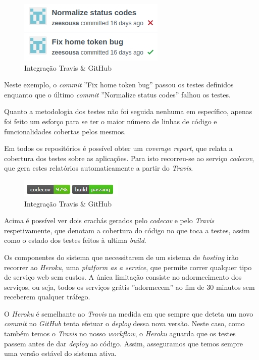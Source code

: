 \begin{figure}[H]
  \centering
        \includegraphics[scale=0.65]{img/github.jpg}
  \caption{Integração Travis \& GitHub}
\end{figure}

Neste exemplo, o \textit{commit} ''Fix home token bug'' passou os testes definidos enquanto que o último \textit{commit} ''Normalize status codes'' falhou os testes.

Quanto a metodologia dos testes não foi seguida nenhuma em específico, apenas foi feito um esforço para se ter o maior número de linhas de código e funcionalidades cobertas pelos mesmos.

Em todos os repositórios é possível obter um \textit{coverage report}, que relata a cobertura dos testes sobre as aplicações. Para isto recorreu-se ao serviço \textit{codecov}, que gera estes relatórios automaticamente a partir do \textit{Travis}.

\begin{figure}[H]
  \centering
        \includegraphics[scale=0.65]{img/github-badges.jpg}
  \caption{Integração Travis \& GitHub}
\end{figure}

Acima é possível ver dois crachás gerados pelo \textit{codecov} e pelo \textit{Travis} respetivamente, que denotam a cobertura do código no que toca a testes, assim como o estado dos testes feitos à ultima \textit{build}.

Os componentes do sistema que necessitarem de um sistema de \textit{hosting} irão recorrer ao \textit{Heroku}, uma \textit{platform as a service}, que permite correr qualquer tipo de serviço web sem custos. A única limitação consiste no adormecimento dos serviços, ou seja, todos os serviços grátis ''adormecem'' ao fim de 30 minutos sem receberem qualquer tráfego.

O \textit{Heroku} é semelhante ao \textit{Travis} na medida em que sempre que deteta um novo \textit{commit} no \textit{GitHub} tenta efetuar o \textit{deploy} dessa nova versão. Neste caso, como também temos o \textit{Travis} no nosso \textit{workflow}, o \textit{Heroku} aguarda que os testes passem antes de dar \textit{deploy} ao código. Assim, asseguramos que temos sempre uma versão estável do sistema ativa.

